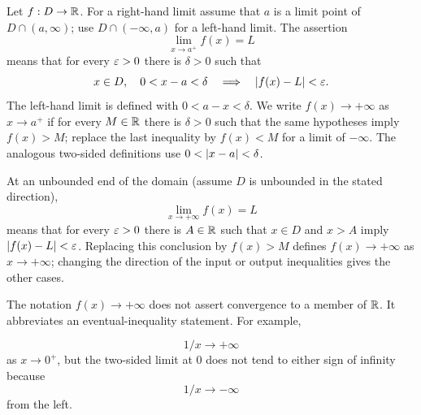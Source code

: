 \begin{definition}
Let $f:D\to\mathbb{R}$. For a right-hand limit assume that $a$ is a limit point
 of $D\cap(a,\infty)$; use $D\cap(-\infty,a)$ for a left-hand limit. The assertion
\[
\lim_{x\to a^+}f(x)=L
\]
means that for every $\varepsilon>0$ there is $\delta>0$ such that
\[
x\in D,\quad 0<x-a<\delta
\quad\Longrightarrow\quad
\lvert f(x)-L\rvert<\varepsilon.
\]
The left-hand limit is defined with $0<a-x<\delta$.  We write
$f(x)\to+\infty$ as $x\to a^+$ if for every $M\in\mathbb{R}$ there is
$\delta>0$ such that the same hypotheses imply $f(x)>M$; replace the last
inequality by $f(x)<M$ for a limit of $-\infty$.  The analogous two-sided
definitions use $0<\lvert x-a\rvert<\delta$.

At an unbounded end of the domain (assume $D$ is unbounded in the stated direction),
\[
\lim_{x\to+\infty}f(x)=L
\]
means that for every $\varepsilon>0$ there is $A\in\mathbb{R}$ such that $x\in D$ and
$x>A$ imply $\lvert f(x)-L\rvert<\varepsilon$.  Replacing this conclusion by $f(x)>M$
defines $f(x)\to+\infty$ as $x\to+\infty$; changing the direction of the
input or output inequalities gives the other cases.
\end{definition}

\begin{remark}
The notation $f(x)\to+\infty$ does not assert convergence to a member of
$\mathbb{R}$.  It abbreviates an eventual-inequality statement.  For example,

\[
1/x\to+\infty
\]
 as $x\to0^+$, but the two-sided limit at $0$ does not tend
to either sign of infinity because
\[
1/x\to-\infty
\]
 from the left.
\end{remark}

